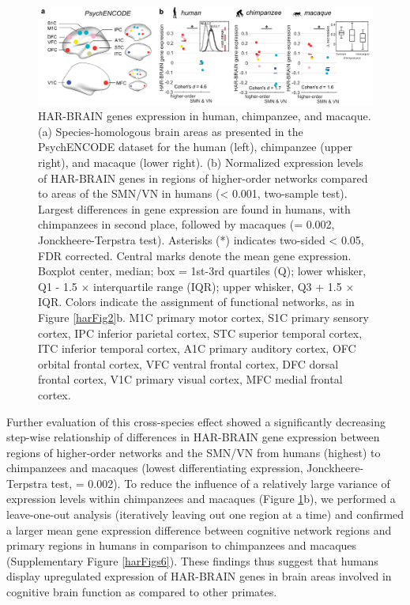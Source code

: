 \begin{refsection}
\begin{figure}[h]
    \centering
    \includegraphics[width=\linewidth]{images/harFig5.png}
    \caption{HAR-BRAIN genes expression in human, chimpanzee, and macaque. (a) Species-homologous brain areas as presented in the PsychENCODE dataset for the human (left), chimpanzee (upper right), and macaque (lower right). (b) Normalized expression levels of HAR-BRAIN genes in regions of higher-order networks compared to areas of the SMN/VN in humans (\pval < 0.001, two-sample \tval test). Largest differences in gene expression are found in humans, with chimpanzees in second place, followed by macaques (\pval = 0.002, Jonckheere-Terpstra test). Asterisks (*) indicates two-sided \pval < 0.05, FDR corrected. Central marks denote the mean gene expression. Boxplot center, median; box = 1st-3rd quartiles (Q); lower whisker, Q1 - 1.5 $\times$ interquartile range (IQR); upper whisker, Q3 + 1.5 $\times$ IQR. Colors indicate the assignment of functional networks, as in Figure \ref{harFig2}b. M1C primary motor cortex, S1C primary sensory cortex, IPC inferior parietal cortex, STC superior temporal cortex, ITC inferior temporal cortex, A1C primary auditory cortex, OFC orbital frontal cortex, VFC ventral frontal cortex, DFC dorsal frontal cortex, V1C primary visual cortex, MFC medial frontal cortex.}
    \label{harFig5}
\end{figure}


Further evaluation of this cross-species effect showed a significantly decreasing step-wise relationship of differences in HAR-BRAIN gene expression between regions of higher-order networks and the SMN/VN from humans (highest) to chimpanzees and macaques (lowest differentiating expression, Jonckheere-Terpstra test, \pval = 0.002). To reduce the influence of a relatively large variance of expression levels within chimpanzees and macaques (Figure \ref{harFig5}b), we performed a leave-one-out analysis (iteratively leaving out one region at a time) and confirmed a larger mean gene expression difference between cognitive network regions and primary regions in humans in comparison to chimpanzees and macaques (Supplementary Figure \ref{harFigs6}). These findings thus suggest that humans display upregulated expression of HAR-BRAIN genes in brain areas involved in cognitive brain function as compared to other primates.


\end{refsection}
